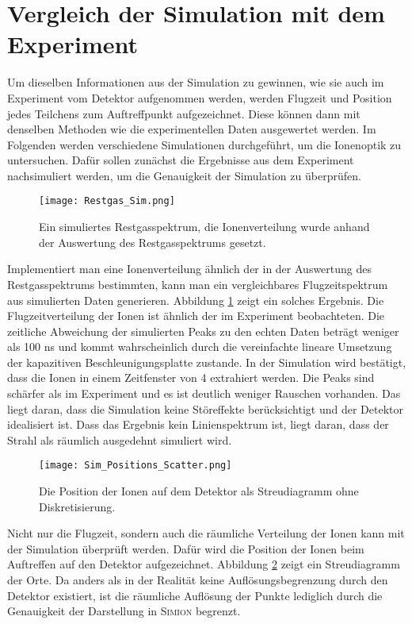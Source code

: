 \section{Vergleich der Simulation mit dem Experiment}
Um dieselben Informationen aus der Simulation zu gewinnen, wie sie auch im Experiment vom Detektor aufgenommen werden, werden Flugzeit und Position jedes Teilchens zum Auftreffpunkt aufgezeichnet. Diese können dann mit denselben Methoden wie die experimentellen Daten ausgewertet werden. Im Folgenden werden verschiedene Simulationen durchgeführt, um die Ionenoptik zu untersuchen. Dafür sollen zunächst die Ergebnisse aus dem Experiment nachsimuliert werden, um die Genauigkeit der Simulation zu überprüfen. 


\begin{figure}
    \centering
    \texttt{[image: Restgas\_Sim.png]}
    \caption[Simuliertes Restgasspektrum]{Ein simuliertes Restgasspektrum, die Ionenverteilung wurde anhand der Auswertung des Restgasspektrums gesetzt.}
    \label{fig:Restgas_Sim}
\end{figure}

Implementiert man eine Ionenverteilung ähnlich der in der Auswertung des Restgasspektrums bestimmten, kann man ein vergleichbares Flugzeitspektrum aus simulierten Daten generieren. Abbildung \ref{fig:Restgas_Sim} zeigt ein solches Ergebnis. Die Flugzeitverteilung der Ionen ist ähnlich der im Experiment beobachteten. Die zeitliche Abweichung der simulierten Peaks zu den echten Daten beträgt weniger als 100 ns und kommt wahrscheinlich durch die vereinfachte lineare Umsetzung der kapazitiven Beschleunigungsplatte zustande. In der Simulation wird bestätigt, dass die Ionen in einem Zeitfenster von 4  extrahiert werden. Die Peaks sind schärfer als im Experiment und es ist deutlich weniger Rauschen vorhanden. Das liegt daran, dass die Simulation keine Störeffekte berücksichtigt und der Detektor idealisiert ist. Dass das Ergebnis kein Linienspektrum ist, liegt daran, dass der Strahl als räumlich ausgedehnt simuliert wird.

\begin{figure}[H]
    \centering
    \texttt{[image: Sim\_Positions\_Scatter.png]}
    \caption[Streudiagramm der simulierten Ionenposition auf dem Detektor]{Die Position der Ionen auf dem Detektor als Streudiagramm ohne Diskretisierung.}
    \label{fig:sim_pos_scatter}
\end{figure}

Nicht nur die Flugzeit, sondern auch die räumliche Verteilung der Ionen kann mit der Simulation überprüft werden. Dafür wird die Position der Ionen beim Auftreffen auf den Detektor aufgezeichnet. Abbildung \ref{fig:sim_pos_scatter} zeigt ein Streudiagramm der Orte. Da anders als in der Realität keine Auflösungsbegrenzung durch den Detektor existiert, ist die räumliche Auflösung der Punkte lediglich durch die Genauigkeit der Darstellung in \textsc{Simion} begrenzt.

